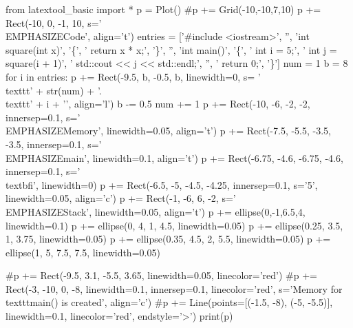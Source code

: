 \begin{python}
from latextool_basic import *
p = Plot()
#p += Grid(-10,-10,7,10)
p += Rect(-10, 0, -1, 10, s='\\EMPHASIZE{Code}', align='t')
entries = ['\#include <iostream>', '', 'int square(int x)', '\{', '    return x * x;', '\}', '', 'int main()', '\{', '    int i = 5;', '    int j = square(i + 1)', '    std::cout << j << std::endl;', '', '    return 0;', '\}']
num = 1
b = 8
for i in entries:
    p += Rect(-9.5, b, -0.5, b, linewidth=0, s= '\\texttt{' + str(num) + '.} \\texttt{' + i + '}', align='l')
    b -= 0.5
    num += 1
p += Rect(-10, -6, -2, -2, innersep=0.1, s='\\EMPHASIZE{Memory}', linewidth=0.05, align='t')
p += Rect(-7.5, -5.5, -3.5, -3.5, innersep=0.1, s='\\EMPHASIZE{main}', linewidth=0.1, align='t')
p += Rect(-6.75, -4.6, -6.75, -4.6, innersep=0.1, s='\\textbf{i}', linewidth=0)
p += Rect(-6.5, -5, -4.5, -4.25, innersep=0.1, s='5', linewidth=0.05, align='c')
p += Rect(-1, -6, 6, -2, s='\\EMPHASIZE{Stack}', linewidth=0.05, align='t')
p += ellipse(0,-1,6.5,4, linewidth=0.1)
p += ellipse(0, 4, 1, 4.5, linewidth=0.05)
p += ellipse(0.25, 3.5, 1, 3.75, linewidth=0.05)
p += ellipse(0.35, 4.5, 2, 5.5, linewidth=0.05)
p += ellipse(1, 5, 7.5, 7.5, linewidth=0.05)

#p += Rect(-9.5, 3.1, -5.5, 3.65, linewidth=0.05, linecolor='red')
#p += Rect(-3, -10, 0, -8, linewidth=0.1, innersep=0.1, linecolor='red', s='Memory for \\texttt{main()} is created', align='c')
#p += Line(points=[(-1.5, -8), (-5, -5.5)], linewidth=0.1, linecolor='red', endstyle='>')
print(p)
\end{python}

